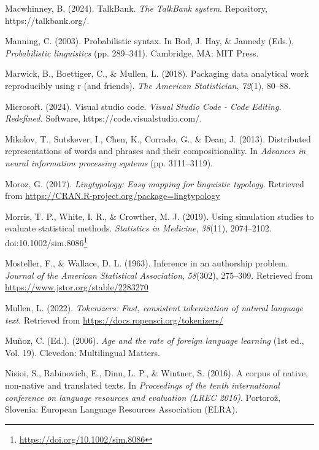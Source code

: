 \documentclass[
  letterpaper,
]{latex/krantz}
\newlength{\cslhangindent}
\newenvironment{CSLReferences}[2] %
 {\begin{list}{}{%
  \setlength{\itemindent}{0pt}
  \setlength{\leftmargin}{0pt}
  \setlength{\parsep}{0pt}
  \ifodd #1
   \setlength{\leftmargin}{\cslhangindent}
   \setlength{\itemindent}{-1\cslhangindent}
  \fi
  \setlength{\itemsep}{#2\baselineskip}}}
 {\end{list}}
\theoremstyle{definition}
\theoremstyle{remark}
\DeclareRobustCommand{\href}[2]{#2\footnote{\url{#1}}}
\begin{document}
\begin{CSLReferences}{1}{0}
Macwhinney, B. (2024). TalkBank. \emph{The TalkBank system}. Repository,
https://talkbank.org/.

Manning, C. (2003). Probabilistic syntax. In Bod, J. Hay, \& Jannedy
(Eds.), \emph{Probabilistic linguistics} (pp. 289--341). Cambridge, MA:
MIT Press.

Marwick, B., Boettiger, C., \& Mullen, L. (2018). Packaging data
analytical work reproducibly using r (and friends). \emph{The American
Statistician}, \emph{72}(1), 80--88.

Microsoft. (2024). Visual studio code. \emph{Visual Studio Code - Code
Editing. Redefined.} Software, https://code.visualstudio.com/.

Mikolov, T., Sutskever, I., Chen, K., Corrado, G., \& Dean, J. (2013).
Distributed representations of words and phrases and their
compositionality. In \emph{Advances in neural information processing
systems} (pp. 3111--3119).

Moroz, G. (2017). \emph{Lingtypology: Easy mapping for linguistic
typology}. Retrieved from
\url{https://CRAN.R-project.org/package=lingtypology}

Morris, T. P., White, I. R., \& Crowther, M. J. (2019). Using simulation
studies to evaluate statistical methods. \emph{Statistics in Medicine},
\emph{38}(11), 2074--2102.
doi:\href{https://doi.org/10.1002/sim.8086}{10.1002/sim.8086}

Mosteller, F., \& Wallace, D. L. (1963). Inference in an authorship
problem. \emph{Journal of the American Statistical Association},
\emph{58}(302), 275--309. Retrieved from
\url{https://www.jstor.org/stable/2283270}

Mullen, L. (2022). \emph{Tokenizers: Fast, consistent tokenization of
natural language text}. Retrieved from
\url{https://docs.ropensci.org/tokenizers/}

Muñoz, C. (Ed.). (2006). \emph{Age and the rate of foreign language
learning} (1st ed., Vol. 19). Clevedon: Multilingual Matters.

Nisioi, S., Rabinovich, E., Dinu, L. P., \& Wintner, S. (2016). A corpus
of native, non-native and translated texts. In \emph{Proceedings of the
tenth international conference on language resources and evaluation
(LREC 2016)}. Portoro{z̆}, Slovenia: European Language Resources
Association (ELRA).


\end{CSLReferences}
\end{document}
